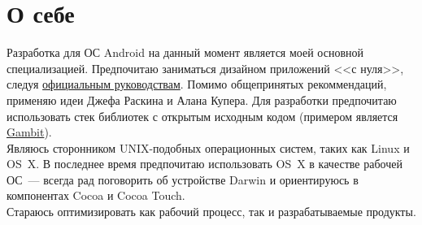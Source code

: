   \section*{О себе}

    Разработка для ОС Android на данный момент является моей основной специализацией.
    Предпочитаю заниматься дизайном приложений <<с нуля>>, следуя
    \href{https://developer.android.com/design/}{официальным руководствам}.
    Помимо общепринятых рекоммендаций, применяю идеи Джефа Раскина
    и Алана Купера. Для разработки предпочитаю использовать стек
    библиотек с открытым исходным кодом (примером является
    \href{https://github.com/ming13/gambit}{Gambit}). \\

    Являюсь сторонником UNIX-подобных операционных систем,
    таких как Linux и OS~X. В последнее время предпочитаю использовать
    OS~X в качестве рабочей ОС~--- всегда рад поговорить об устройстве Darwin
    и ориентируюсь в компонентах Cocoa и Cocoa Touch. \\

    Стараюсь оптимизировать как рабочий процесс,
    так и разрабатываемые продукты. \\

  \vfill


